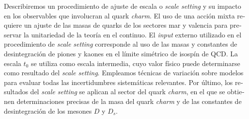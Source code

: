 \begin{otherlanguage}{spanish}
Describiremos un procedimiento de ajuste de escala o \textit{scale setting} y su impacto en los observables que involucran al quark \textit{charm}. El uso de una acción mixta requiere un ajuste de las masas de quarks de los sectores mar y valencia para preservar la unitariedad de la teoría en el continuo. El \textit{input} externo utilizado en el procedimiento de \textit{scale setting} corresponde al uso de las masas y constantes de desintegración de piones y kaones en el límite simétrico de isospín de QCD. La escala $t_0$ se utiliza como escala intermedia, cuyo valor físico puede determinarse como resultado del \textit{scale setting}. Empleamos técnicas de variación sobre modelos para evaluar todas las incertidumbres sistemáticas relevantes. Por último, los resultados del \textit{scale setting} se aplican al sector del quark \textit{charm}, en el que se obtienen determinaciones precisas de la masa del quark \textit{charm} y de las constantes de desintegración de los mesones $D$ y $D_s$. 

\end{otherlanguage}

\endgroup

\vfill
